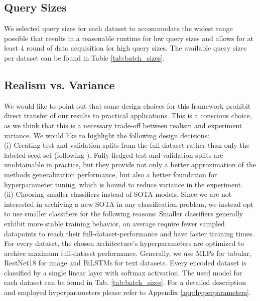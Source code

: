 \documentclass[]{article}
\begin{document}
\subsection{Query Sizes}\label{sec:batch_sizes}
We selected query sizes for each dataset to accommodate the widest range possible that results in a reasonable runtime for low query sizes and allows for at least 4 round of data acquisition for high query sizes.
The available query sizes per dataset can be found in Table \ref{tab:batch_sizes}.

\subsection{Realism vs. Variance}\label{sec:realism}
We would like to point out that some design choices for this framework prohibit direct transfer of our results to practical applications. 
This is a conscious choice, as we think that this is a necessary trade-off between realism and experiment variance.
We would like to highlight the following design decisions: \\
(i) Creating test and validation splits from the full dataset rather than only the labeled seed set (following \cite{luth2024navigating}). Fully fledged test and validation splits are unobtainable in practice, but they provide not only a better approximation of the methods generalization performance, but also a better foundation for hyperparameter tuning, which is bound to reduce variance in the experiment. \\
(ii) Choosing smaller classifiers instead of SOTA models. Since we are not interested in archiving a new SOTA in any classification problem, we instead opt to use smaller classifiers for the following reasons:
Smaller classifiers generally exhibit more stable training behavior, on average require fewer sampled datapoints to reach their full-dataset-performance and have faster training times.
For every dataset, the chosen architecture's hyperparameters are optimized to archive maximum full-dataset performance.
Generally, we use MLPs for tabular, RestNet18 for image and BiLSTMs for text datasets.
Every encoded dataset is classified by a single linear layer with softmax activation.
The used model for each dataset can be found in Tab. \ref{tab:batch_sizes}.
For a detailed description and employed hyperparameters please refer to Appendix \ref{app:hyperparameters}.
\end{document}
